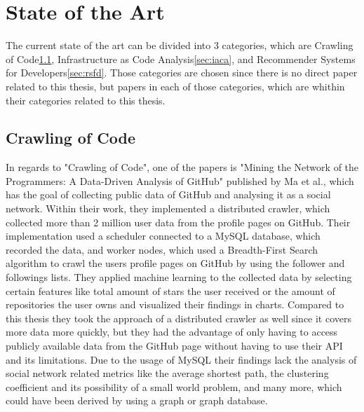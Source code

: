 \chapter{State of the Art}
The current state of the art can be divided into 3 categories, which are Crawling of Code\ref{sec:coc}, Infrastructure as Code Analysis\ref{sec:iaca}, and Recommender Systems for Developers\ref{sec:rsfd}. Those categories are chosen since there is no direct paper related to this thesis, but papers in each of those categories, which are whithin their categories related to this thesis.


\section{Crawling of Code}
\label{sec:coc}
In regards to "Crawling of Code", one of the papers is "Mining the Network of the Programmers: A Data-Driven Analysis of GitHub"  published by Ma et al., which has the goal of collecting public data of GitHub and analysing it as a social network. Within their work, they implemented a distributed crawler, which collected more than 2 million user data from the profile pages on GitHub. Their implementation used a scheduler connected to a MySQL database, which recorded the data, and worker nodes, which used a Breadth-First Search algorithm to crawl the users profile pages on GitHub by using the follower and followings lists. They applied machine learning to the collected data by selecting certain features like total amount of stars the user received or the amount of repositories the user owns and visualized their findings in charts.
Compared to this thesis they took the approach of a distributed crawler as well since it covers more data more quickly, but they had the advantage of only having to access publicly available data from the GitHub page without having to use their API and its limitations. Due to the usage of MySQL their findings lack the analysis of social network related metrics like the average shortest path, the clustering coefficient and its possibility of a small world problem, and many more, which could have been derived by using a graph or graph database. %

